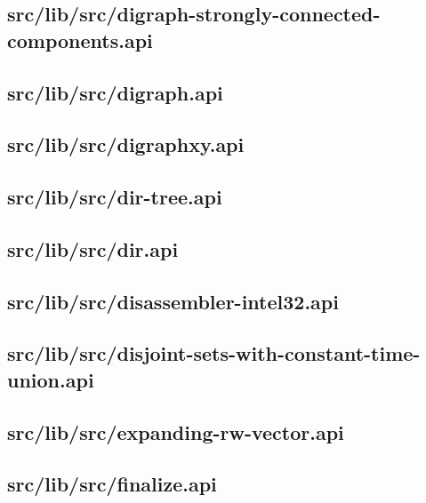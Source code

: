 \subsection{src/lib/src/digraph-strongly-connected-components.api}


\subsection{src/lib/src/digraph.api}


\subsection{src/lib/src/digraphxy.api}


\subsection{src/lib/src/dir-tree.api}


\subsection{src/lib/src/dir.api}


\subsection{src/lib/src/disassembler-intel32.api}


\subsection{src/lib/src/disjoint-sets-with-constant-time-union.api}


\subsection{src/lib/src/expanding-rw-vector.api}


\subsection{src/lib/src/finalize.api}


